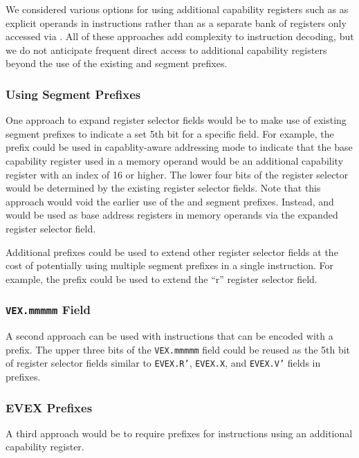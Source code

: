 We considered various options for using additional capability
registers such as \CGS{} as explicit operands in instructions rather
than as a separate bank of registers only accessed via
.  All of these approaches add complexity to
instruction decoding, but we do not anticipate frequent direct access
to additional capability registers beyond the use of the existing
\FS{} and \GS{} segment prefixes.

\subsubsection{Using Segment Prefixes}

One approach to expand register selector fields would be to make use
of existing segment prefixes to indicate a set 5th bit for a specific
field.  For example, the \GS{} prefix could be used in capablity-aware
addressing mode to indicate that the base capability register used in
a memory operand would be an additional capability register with an
index of 16 or higher.  The lower four bits of the register selector
would be determined by the existing register selector fields.   Note
that this approach would void the earlier use of the \FS{} and \GS{}
segment prefixes.  Instead, \CFS{} and \CGS{} would be used as base
address registers in memory operands via the expanded register
selector field.

Additional prefixes could be used to extend other register selector
fields at the cost of potentially using multiple segment prefixes in a
single instruction.  For example, the \FS{} prefix could be used to
extend the ``r'' register selector field.

\subsubsection{\texttt{VEX.mmmmm} Field}

A second approach can be used with instructions that can be encoded
with a \VEX{} prefix.  The upper three bits of the \texttt{VEX.mmmmm}
field could be reused as the 5th bit of register selector fields
similar to \texttt{EVEX.R'}, \texttt{EVEX.X}, and \texttt{EVEX.V'}
fields in \EVEX{} prefixes.

\subsubsection{EVEX Prefixes}

A third approach would be to require \EVEX{} prefixes for instructions
using an additional capability register.

